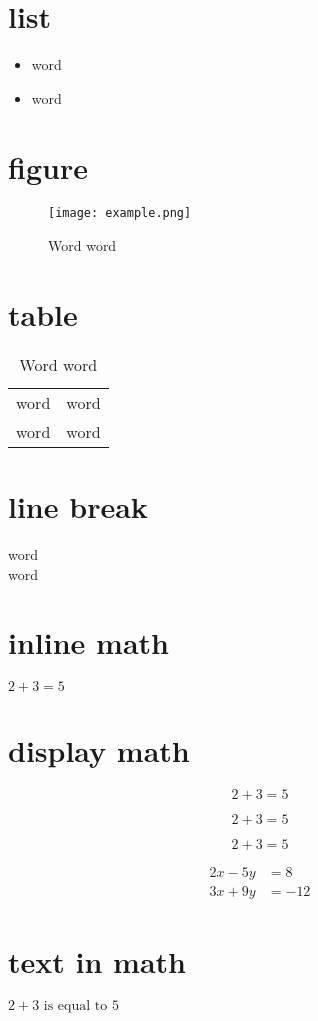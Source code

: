 \documentclass{article}
\begin{document}
\section{list}
\begin{itemize}
    \item word %
    \item word %
\end{itemize}

\section{figure}
\begin{figure}
    \texttt{[image: example.png]} %
    \caption{Word word} %
\end{figure}

\section{table}
\begin{table}
    \begin{tabular}{c|c}
       word & word \\ %
       word & word %
    \end{tabular}
    \caption{Word word} %
\end{table}

\section{line break}
word\\word %

\section{inline math}
$2+3=5$ %

\section{display math}
\[2+3=5\]

\begin{equation}
    2+3=5
\end{equation}

\begin{equation*}
    2+3=5
\end{equation*}

\begin{align*}
2x - 5y &=  8 \\
3x + 9y &=  -12
\end{align*}

\section{text in math}

$ 2+3 \text{ is equal to } 5 $
\end{document}
